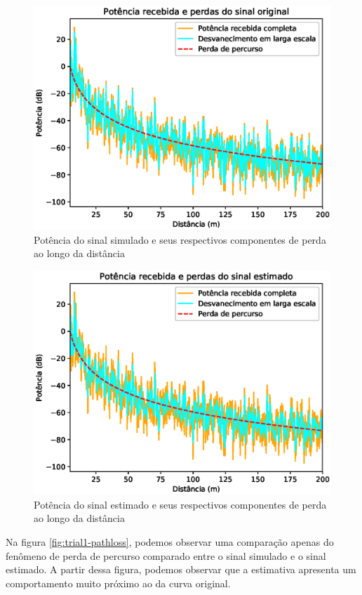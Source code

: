 \documentclass[journal,11pt,twocolumn]{IEEEtran}
\begin{document}
\begin{figure}[h!]
    \centering
    \includegraphics[scale=0.55]{trial1_original.eps}
    \caption{Potência do sinal simulado e seus respectivos componentes de perda ao longo da distância}
    \label{fig:trial1-original}
\end{figure}
\begin{figure}[h!]
    \centering
    \includegraphics[scale=0.55]{trial1_estimated.eps}
    \caption{Potência do sinal estimado e seus respectivos componentes de perda ao longo da distância}
    \label{fig:trial1-estimated}
\end{figure}
Na figura \ref{fig:trial1-pathloss}, podemos observar uma comparação apenas do fenômeno de perda de percurso comparado entre o sinal simulado e o sinal estimado. A partir dessa figura, podemos observar que a estimativa apresenta um comportamento muito próximo ao da curva original.
\end{document}
